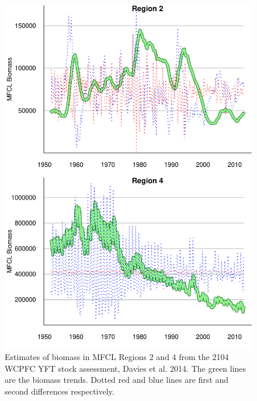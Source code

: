 \documentclass[12pt,letterpaper]{article}
\begin{document}
\begin{figure}
\begin{center}
\includegraphics[height=0.8\textheight]{./graphics/MFCL_region_biomass.pdf}
\caption{\label{fig:MFCLregionB}
Estimates of biomass in MFCL Regions 2 and 4 from the 2104 WCPFC YFT
stock assessment, Davies et al. 2014. The green lines are the biomass
trends. Dotted red and blue lines are first and second differences
respectively.}
\end{center}
\end{figure}

\end{document}
